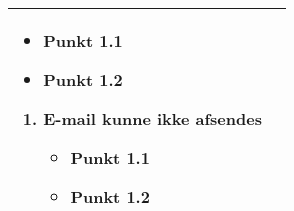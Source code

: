 \begin{center}
\begin{longtable}{|p{5cm}|p{9cm}|}
\begin{enumerate}[label=\ref{kravspec:uc4_autovugning}.a]
\begin{itemize}
					\item Punkt 1.1
					\item Punkt 1.2					
					
					\end{itemize}
			\end{enumerate}
			\begin{enumerate}[label=\ref{kravspec:uc4_emailafsend}.a]
			\item E-mail kunne ikke afsendes
					\begin{itemize}
					
					\item Punkt 1.1
					\item Punkt 1.2					
					
					\end{itemize}
			\end{enumerate}
		\\\hline
	\end{longtable} 
\end{center}

